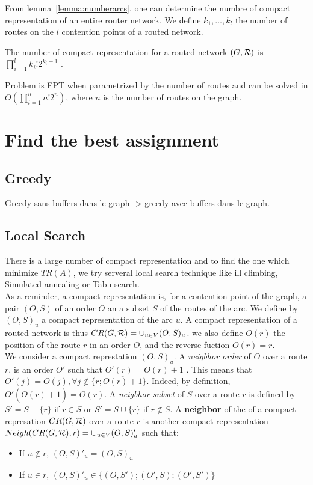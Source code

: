 \documentclass[english]{article}
\begin{document}
From lemma~\ref{lemma:numberarcs}, one can determine the numbre of compact representation of an entire router network.
We define $k_1,\ldots,k_l$ the number of routes on the $l$ contention points of a routed network.
\begin{theorem}
 The number of compact representation for a routed network $(G,{\cal R})$ is $\prod_{i=1}^l k_i!2^{k_i-1}$ .
 \label{theorem:numbergraph}
\end{theorem}


\begin{corollary}
 Problem \spall is FPT when parametrized by the number of routes and can be solved in $O(\prod_{i=1}^n n!2^{n})$, where $n$ is the number of routes on the graph.
\end{corollary}



\section{Find the best assignment}
\subsection{Greedy}
Greedy sans buffers dans le graph -> greedy avec buffers dans le graph.

\subsection{Local Search}

There is a large number of compact representation and to find the one which minimize $TR(A)$, we try serveral local search technique like ill climbing, Simulated annealing or Tabu search.\\

As a reminder, a compact representation is, for a contention point of the graph, a pair $(O,S)$ of an order $O$ an a subset $S$ of the routes of the arc.
We define by $(O,S)_u$ a compact representation of the arc $u$. A compact representation of a routed network is thus $CR(G,{\cal R}) = \cup_ {u\in V} (O,S)_u$.
we also define $O(r)$ the position of the route $r$ in an order $O$, and the reverse fuction $\overline{O(r)} = r$.\\
We consider a compact represtation $(O,S)_u$.
A \textit{neigbhor order} of  $O$ over a route $r$, is an order $O'$ such that $O'(r) = O(r)+1$ . This means that $O'(j) = O(j),\forall j \notin \{r;\overline{O(r)+1}\}$. Indeed, by definition, $O'(\overline{O(r)+1}) = O(r)$.
A \textit{neigbhor subset} of $S$ over a route $r$ is defined by $S' = S - \{r\}$ if $r\in S$ or $S'= S \cup \{r\}$ if $ r \notin S$.
A \textbf{neighbor} of the of a compact represation $CR(G,{\cal R})$ over a route $r$ is another compact representation $Neigh(CR(G,{\cal R}),r) = \cup_ {u\in V} (O,S)'_u$ such that:
\begin{itemize}
 \item If $u \notin r$, $(O,S)'_u = (O,S)_u$
 \item If $u \in r$, $(O,S)'_u \in \{(O,S');(O',S);(O',S')\}$
\end{itemize}
\end{document}
